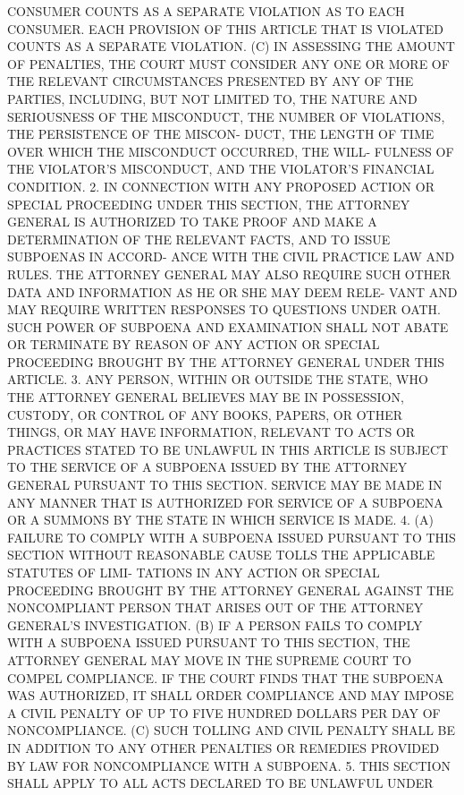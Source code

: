  CONSUMER COUNTS AS A  SEPARATE  VIOLATION  AS  TO  EACH  CONSUMER.  EACH
 PROVISION  OF  THIS  ARTICLE  THAT  IS  VIOLATED  COUNTS  AS  A SEPARATE
 VIOLATION.
   (C)  IN ASSESSING THE AMOUNT OF PENALTIES, THE COURT MUST CONSIDER ANY
 ONE OR MORE OF THE  RELEVANT  CIRCUMSTANCES  PRESENTED  BY  ANY  OF  THE
 PARTIES,  INCLUDING,  BUT  NOT LIMITED TO, THE NATURE AND SERIOUSNESS OF
 THE MISCONDUCT, THE NUMBER OF VIOLATIONS, THE PERSISTENCE OF THE MISCON-
 DUCT, THE LENGTH OF TIME OVER WHICH THE MISCONDUCT OCCURRED,  THE  WILL-
 FULNESS  OF  THE  VIOLATOR'S  MISCONDUCT,  AND  THE VIOLATOR'S FINANCIAL
 CONDITION.
   2. IN CONNECTION WITH ANY PROPOSED ACTION OR SPECIAL PROCEEDING  UNDER
 THIS  SECTION, THE ATTORNEY GENERAL IS AUTHORIZED TO TAKE PROOF AND MAKE
 A DETERMINATION OF THE RELEVANT FACTS, AND TO ISSUE SUBPOENAS IN ACCORD-
 ANCE WITH THE CIVIL PRACTICE LAW AND RULES.   THE ATTORNEY  GENERAL  MAY
 ALSO REQUIRE SUCH OTHER DATA AND INFORMATION AS HE OR SHE MAY DEEM RELE-
 VANT  AND  MAY  REQUIRE WRITTEN RESPONSES TO QUESTIONS UNDER OATH.  SUCH
 POWER OF SUBPOENA AND EXAMINATION SHALL NOT ABATE OR TERMINATE BY REASON
 OF ANY ACTION OR SPECIAL PROCEEDING  BROUGHT  BY  THE  ATTORNEY  GENERAL
 UNDER THIS ARTICLE.
   3.  ANY  PERSON, WITHIN OR OUTSIDE THE STATE, WHO THE ATTORNEY GENERAL
 BELIEVES MAY BE IN POSSESSION, CUSTODY, OR CONTROL OF ANY BOOKS, PAPERS,
 OR OTHER THINGS, OR MAY HAVE INFORMATION, RELEVANT TO ACTS OR  PRACTICES
 STATED  TO  BE  UNLAWFUL  IN THIS ARTICLE IS SUBJECT TO THE SERVICE OF A
 SUBPOENA ISSUED BY  THE  ATTORNEY  GENERAL  PURSUANT  TO  THIS  SECTION.
 SERVICE  MAY  BE  MADE IN ANY MANNER THAT IS AUTHORIZED FOR SERVICE OF A
 SUBPOENA OR A SUMMONS BY THE STATE IN WHICH SERVICE IS MADE.
   4. (A) FAILURE TO   COMPLY WITH A SUBPOENA  ISSUED  PURSUANT  TO  THIS
 SECTION  WITHOUT REASONABLE CAUSE TOLLS THE APPLICABLE STATUTES OF LIMI-
 TATIONS IN ANY ACTION OR SPECIAL  PROCEEDING  BROUGHT  BY  THE  ATTORNEY
 GENERAL  AGAINST THE NONCOMPLIANT PERSON THAT ARISES OUT OF THE ATTORNEY
 GENERAL'S INVESTIGATION.
   (B) IF A PERSON FAILS TO COMPLY WITH A  SUBPOENA  ISSUED  PURSUANT  TO
 THIS  SECTION,  THE  ATTORNEY  GENERAL  MAY MOVE IN THE SUPREME COURT TO
 COMPEL COMPLIANCE.  IF THE COURT FINDS THAT THE SUBPOENA WAS AUTHORIZED,
 IT SHALL ORDER COMPLIANCE AND MAY IMPOSE A CIVIL PENALTY OF UP  TO  FIVE
 HUNDRED DOLLARS PER DAY OF NONCOMPLIANCE.
   (C)  SUCH  TOLLING AND CIVIL PENALTY SHALL BE IN ADDITION TO ANY OTHER
 PENALTIES OR REMEDIES PROVIDED BY LAW FOR NONCOMPLIANCE WITH A SUBPOENA.
   5. THIS SECTION SHALL APPLY TO ALL ACTS DECLARED TO BE UNLAWFUL  UNDER
